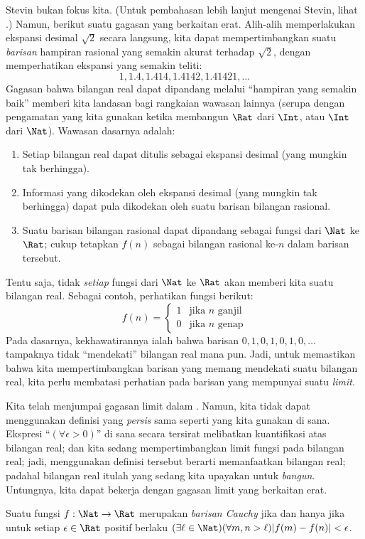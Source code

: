 \documentclass[../../../include/open-logic-section]{subfiles}
\begin{document}
Stevin bukan fokus kita. (Untuk pembahasan lebih lanjut mengenai Stevin, lihat
\citealt{KatzKatz2012}.) Namun, berikut suatu gagasan yang berkaitan erat.
Alih-alih memperlakukan ekspansi desimal $\sqrt{2}$ secara langsung, kita
dapat mempertimbangkan suatu \emph{barisan} hampiran rasional yang semakin
akurat terhadap $\sqrt{2}$, dengan memperhatikan ekspansi yang semakin teliti:
\[
1, 1.4, 1.414, 1.4142, 1.41421,\ldots
\]
Gagasan bahwa bilangan real dapat dipandang melalui ``hampiran yang semakin
baik'' memberi kita landasan bagi rangkaian wawasan lainnya (serupa dengan
pengamatan yang kita gunakan ketika membangun $\Rat$ dari $\Int$, atau $\Int$
dari $\Nat$). Wawasan dasarnya adalah:
\begin{enumerate}
	\item Setiap bilangan real dapat ditulis sebagai ekspansi desimal
	(yang mungkin tak berhingga).
	\item Informasi yang dikodekan oleh ekspansi desimal (yang mungkin tak
	berhingga) dapat pula dikodekan oleh suatu barisan bilangan rasional.
	\item Suatu barisan bilangan rasional dapat dipandang sebagai fungsi
	dari $\Nat$ ke $\Rat$; cukup tetapkan $f(n)$ sebagai bilangan rasional
	ke-$n$ dalam barisan tersebut.
\end{enumerate}
Tentu saja, tidak \emph{setiap} fungsi dari $\Nat$ ke $\Rat$ akan memberi kita
suatu bilangan real. Sebagai contoh, perhatikan fungsi berikut:
\[
	f(n) =\begin{cases}
			1 & \text{jika }n\text{ ganjil}\\
			0 &\text{jika }n\text{ genap}
		\end{cases}
\]
Pada dasarnya, kekhawatirannya ialah bahwa barisan $0,1,0,1,0,1,0,\ldots$
tampaknya tidak ``mendekati'' bilangan real mana pun. Jadi, untuk memastikan
bahwa kita mempertimbangkan barisan yang memang mendekati suatu bilangan real,
kita perlu membatasi perhatian pada barisan yang mempunyai suatu
\emph{limit}.

Kita telah menjumpai gagasan limit dalam . Namun,
kita tidak dapat menggunakan definisi yang \emph{persis} sama seperti yang
kita gunakan di sana. Ekspresi ``$(\forall \epsilon>0)$'' di sana secara
tersirat melibatkan kuantifikasi atas bilangan real; dan kita sedang
mempertimbangkan limit fungsi pada bilangan real; jadi, menggunakan definisi
tersebut berarti memanfaatkan bilangan real; padahal bilangan real itulah yang
sedang kita upayakan untuk \emph{bangun}. Untungnya, kita dapat bekerja dengan
gagasan limit yang berkaitan erat.
\begin{defn}
  Suatu fungsi $f: \Nat \to \Rat$ merupakan \emph{barisan Cauchy} jika dan hanya jika untuk
  setiap $\epsilon \in \Rat$ positif berlaku $(\exists \ell \in
  \Nat)(\forall m, n > \ell)|f(m) - f(n)| < \epsilon$.
\end{defn}
\end{document}
